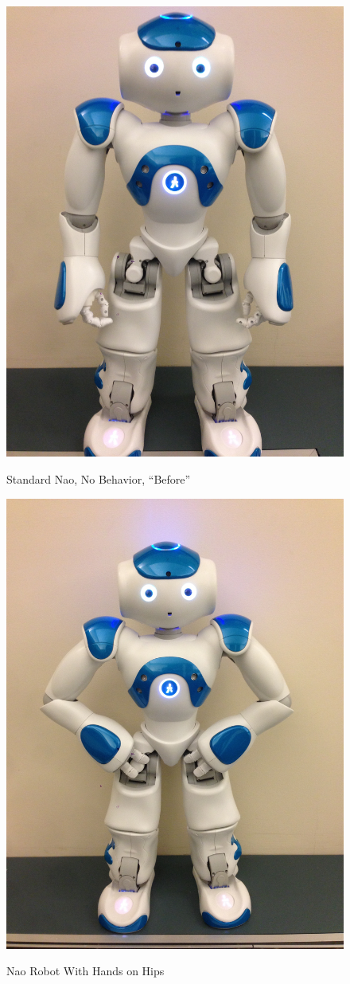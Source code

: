\documentclass{acm_proc_article-sp}
\begin{document}
\begin{figure}[t!]
\centering
 \includegraphics[width=0.65\linewidth]{images/normal3.jpg}\\
 \caption{Standard Nao, No Behavior, ``Before''}
 \label{f:bert}%
\end{figure}

\begin{figure}[t!]
\centering
 \includegraphics[width=0.65\linewidth]{images/hips7.jpg}\\
 \caption{Nao Robot With Hands on Hips}
 \label{f:bert} %
\end{figure}
\end{document}

